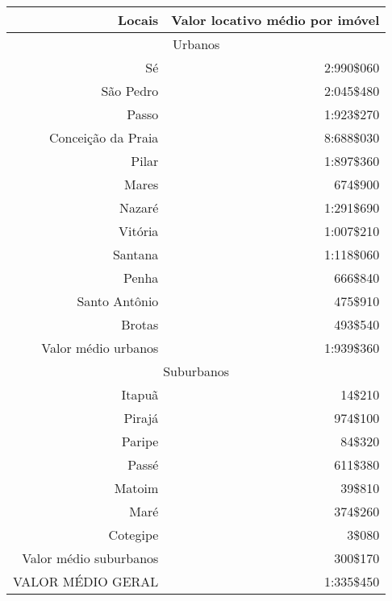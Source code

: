 \begin{table}[!htp]
{
\begin{tabular}{rr}
\hline
Locais	&Valor locativo médio por imóvel\\
\hline
\hline
\multicolumn{2}{c}{Urbanos}\\
\hline
Sé	&2:990\$060\\
São Pedro	&2:045\$480\\
Passo	&1:923\$270\\
Conceição da Praia	&8:688\$030\\
Pilar	&1:897\$360\\
Mares	&674\$900\\
Nazaré	&1:291\$690\\
Vitória	&1:007\$210\\
Santana	&1:118\$060\\
Penha	&666\$840\\
Santo Antônio	&475\$910\\
Brotas	&493\$540\\
Valor médio urbanos	&1:939\$360\\
\hline
\multicolumn{2}{c}{Suburbanos}\\
\hline
Itapuã	&14\$210\\
Pirajá	&974\$100\\
Paripe	&84\$320\\
Passé	&611\$380\\
Matoim	&39\$810\\
Maré	&374\$260\\
Cotegipe	&3\$080\\
Valor médio suburbanos	&300\$170\\
\hline
VALOR MÉDIO GERAL	&1:335\$450\\
\hline
\end{tabular} 
}
{}
\end{table}